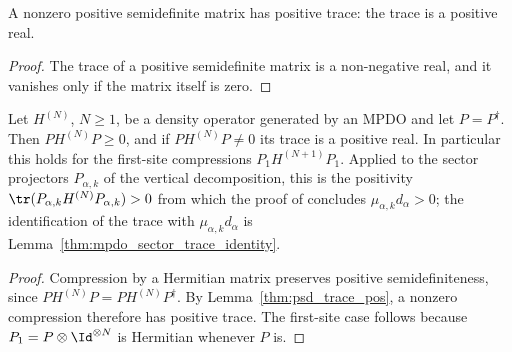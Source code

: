 \begin{lemma}
    \label{thm:psd_trace_pos}
    \leanok
    A nonzero positive semidefinite matrix has positive trace: the trace is
    a positive real.
\end{lemma}

\begin{proof}
    \leanok
    The trace of a positive semidefinite matrix is a non-negative real, and
    it vanishes only if the matrix itself is zero.
\end{proof}

\begin{lemma}
    \label{thm:mpdo_sector_compression_trace_pos}
    \leanok
    Let $H^{(N)}$, $N\geq1$, be a density operator generated by an MPDO and let
    $P=P^\dagger$. Then $PH^{(N)}P\ge 0$, and if $PH^{(N)}P\ne 0$ its
    trace is a positive real. In particular this holds for the first-site
    compressions $P_1H^{(N+1)}P_1$. Applied to the sector projectors
    $P_{\alpha,k}$ of the vertical decomposition, this is the positivity
    $\tr(P_{\alpha,k}H^{(N)}P_{\alpha,k})>0$ from which the proof of
    \cite[Proposition~4.13]{Cirac2016MPDO_arXiv} concludes
    $\mu_{\alpha,k}d_\alpha>0$; the identification of the trace with
    $\mu_{\alpha,k}d_\alpha$ is Lemma~\ref{thm:mpdo_sector_trace_identity}.
\end{lemma}

\begin{proof}
    \leanok
    Compression by a Hermitian matrix preserves positive semidefiniteness,
    since $PH^{(N)}P=PH^{(N)}P^\dagger$. By
    Lemma~\ref{thm:psd_trace_pos}, a nonzero compression therefore has
    positive trace. The first-site case follows because
    $P_1=P\otimes\Id^{\otimes N}$ is Hermitian whenever $P$ is.
\end{proof}

